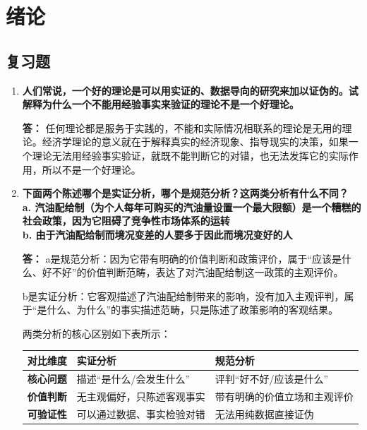 
	\chapter{绪论}
	
	\section{复习题}
	\begin{enumerate}[label=\textbf{\arabic*.}, leftmargin=*]
		
		\item \textbf{人们常说，一个好的理论是可以用实证的、数据导向的研究来加以证伪的。试解释为什么一个不能用经验事实来验证的理论不是一个好理论。}
		
		\textbf{答：}
		任何理论都是服务于实践的，不能和实际情况相联系的理论是无用的理论。经济学理论的意义就在于解释真实的经济现象、指导现实的决策，如果一个理论无法用经验事实验证，就既不能判断它的对错，也无法发挥它的实际作用，所以不是一个好理论。
		
		\item \textbf{下面两个陈述哪个是实证分析，哪个是规范分析？这两类分析有什么不同？\\ a. 汽油配给制（为个人每年可购买的汽油量设置一个最大限额）是一个糟糕的社会政策，因为它阻碍了竞争性市场体系的运转\\ b. 由于汽油配给制而境况变差的人要多于因此而境况变好的人}
		
		\textbf{答：}
		a是规范分析：因为它带有明确的价值判断和政策评价，属于“应该是什么、好不好”的价值判断范畴，表达了对汽油配给制这一政策的主观评价。
		
		b是实证分析：它客观描述了汽油配给制带来的影响，没有加入主观评判，属于“是什么、为什么”的事实描述范畴，只是陈述了政策影响的客观结果。
		
		两类分析的核心区别如下表所示：
		
		\begin{center}
			\begin{tabularx}{\textwidth}{c >{\centering\arraybackslash}X >{\centering\arraybackslash}X}
				\toprule
				\textbf{对比维度} & \textbf{实证分析} & \textbf{规范分析} \\
				\midrule
				\textbf{核心问题} & 描述“是什么/会发生什么” & 评判“好不好/应该是什么” \\
				\textbf{价值判断} & 无主观偏好，只陈述客观事实 & 带有明确的价值立场和主观评价 \\
				\textbf{可验证性} & 可以通过数据、事实检验对错 & 无法用纯数据直接证伪 \\
				\bottomrule
			\end{tabularx}
		\end{center}
		

\end{enumerate}
